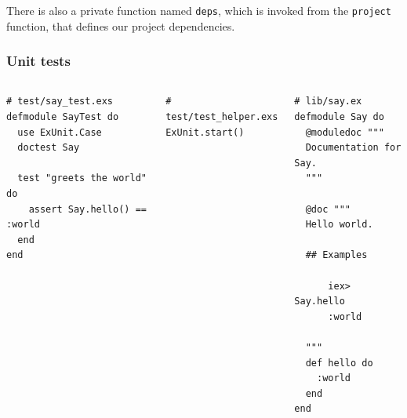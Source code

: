 \documentclass[10pt,xcolor=pdflatex,dvipsnames,table]{beamer}
\begin{document}
\begin{frame}[fragile]
{There is also a private function named \texttt{deps}, which is invoked from the
\texttt{project} function, that defines our project dependencies.
}
\end{frame}

\begin{frame}[fragile]
\frametitle{Unit tests}

\begin{columns}[c]
\begin{example}
\begin{verbatim}
# test/say_test.exs
defmodule SayTest do
  use ExUnit.Case
  doctest Say

  test "greets the world" do
    assert Say.hello() == :world
  end
end
\end{verbatim}
\end{example}

\begin{example}
\begin{verbatim}
# test/test_helper.exs
ExUnit.start()
\end{verbatim}
\end{example}

\begin{example}
\begin{verbatim}
# lib/say.ex
defmodule Say do
  @moduledoc """
  Documentation for Say.
  """

  @doc """
  Hello world.

  ## Examples

      iex> Say.hello
      :world

  """
  def hello do
    :world
  end
end
\end{verbatim}
\end{example}
\end{columns}
\end{frame}
\end{document}
